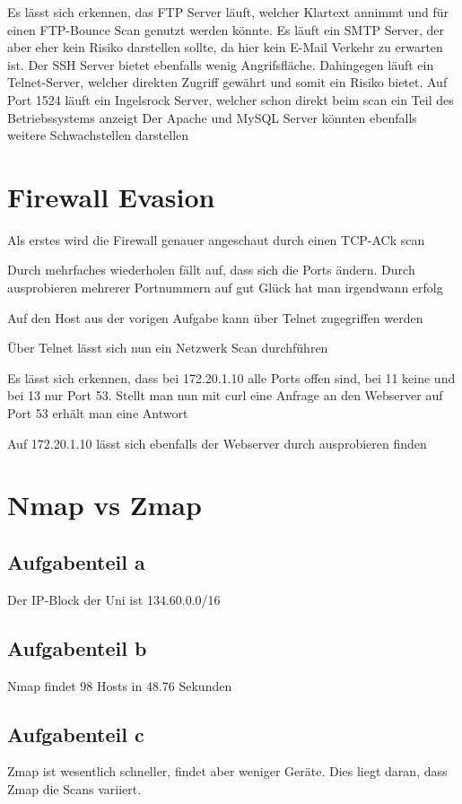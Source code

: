 \documentclass[a4paper,12pt,
headsepline,           %
twoside,               %
pointlessnumbers,      %
bibtotoc,              %
BCOR15mm               %
]{scrbook}
\begin{document}
Es lässt sich erkennen, das FTP Server läuft, welcher Klartext annimmt und für einen FTP-Bounce Scan genutzt werden könnte. Es läuft ein SMTP Server, der aber eher kein Risiko darstellen sollte, da hier kein E-Mail Verkehr zu erwarten ist. Der SSH Server bietet ebenfalls wenig Angrifsfläche. Dahingegen läuft
ein Telnet-Server, welcher direkten Zugriff gewährt und somit ein Risiko bietet. Auf Port 1524 läuft ein Ingelsrock Server, welcher schon direkt beim scan ein Teil des Betriebssystems anzeigt
Der Apache und MySQL Server könnten ebenfalls weitere Schwachstellen darstellen

\section*{Firewall Evasion}
Als erstes wird die Firewall genauer angeschaut durch einen TCP-ACk scan

Durch mehrfaches wiederholen fällt auf, dass sich die Ports ändern. Durch ausprobieren mehrerer Portnummern auf gut Glück hat man irgendwann erfolg

Auf den Host aus der vorigen Aufgabe kann über Telnet zugegriffen werden

Über Telnet lässt sich nun ein Netzwerk Scan durchführen

Es lässt sich erkennen, dass bei 172.20.1.10 alle Ports offen sind, bei 11 keine und bei 13 nur Port 53. Stellt man nun mit curl eine Anfrage an den Webserver auf Port 53 erhält man eine Antwort

Auf 172.20.1.10 lässt sich ebenfalls der Webserver durch ausprobieren finden


\section*{Nmap vs Zmap}
\subsection*{Aufgabenteil a}
Der IP-Block der Uni ist 134.60.0.0/16
\subsection*{Aufgabenteil b}

Nmap findet 98 Hosts in 48.76 Sekunden
\subsection*{Aufgabenteil c}

Zmap ist wesentlich schneller, findet aber weniger Geräte. Dies liegt daran, dass Zmap die Scans variiert.
\end{document}

